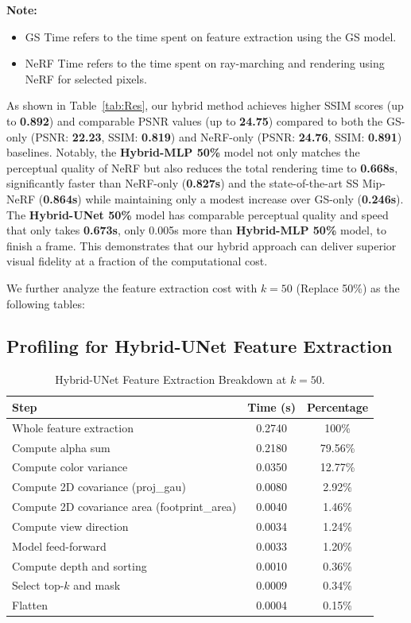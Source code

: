 \documentclass[10pt,letterpaper]{article}
\begin{document}
\noindent \textbf{Note:}
\begin{itemize}
	\item GS Time refers to the time spent on feature extraction using the GS model.
	\item NeRF Time refers to the time spent on ray-marching and rendering using NeRF for selected pixels.
\end{itemize}

As shown in Table~\ref{tab:Res}, our hybrid method achieves higher SSIM scores (up to \textbf{0.892}) and comparable PSNR values (up to \textbf{24.75}) compared to both the GS-only (PSNR: \textbf{22.23}, SSIM: \textbf{0.819}) and NeRF-only (PSNR: \textbf{24.76}, SSIM: \textbf{0.891}) baselines. Notably, the \textbf{Hybrid-MLP 50\%} model not only matches the perceptual quality of NeRF but also reduces the total rendering time to \textbf{0.668s}, significantly faster than NeRF-only (\textbf{0.827s}) and the state-of-the-art SS Mip-NeRF (\textbf{0.864s}) while maintaining only a modest increase over GS-only (\textbf{0.246s}). The \textbf{Hybrid-UNet 50\%} model has comparable perceptual quality and speed that only takes \textbf{0.673s}, only 0.005s more than \textbf{Hybrid-MLP 50\%} model, to finish a frame. This demonstrates that our hybrid approach can deliver superior visual fidelity at a fraction of the computational cost.


We further analyze the feature extraction cost with $k=50$ (Replace 50\%) as the following tables:

\subsection*{Profiling for Hybrid-UNet Feature Extraction}
\begin{table}[H]
	\centering
	\scriptsize
	\begin{tabular}{|l|c|c|}
		\hline
		Step & Time (s) & Percentage \\
		\hline
		Whole feature extraction   & 0.2740 & 100\% \\
		Compute alpha sum          & 0.2180 & 79.56\% \\
		Compute color variance     & 0.0350 & 12.77\% \\
		Compute 2D covariance (proj\_gau)      & 0.0080 & 2.92\% \\
		Compute 2D covariance area (footprint\_area) & 0.0040 & 1.46\% \\
		Compute view direction     & 0.0034 & 1.24\% \\
		Model feed-forward         & 0.0033 & 1.20\% \\
	    Compute depth and sorting  & 0.0010 & 0.36\% \\
	    Select top-$k$ and mask    & 0.0009 & 0.34\% \\
	    Flatten                    & 0.0004 & 0.15\% \\
		\hline
	\end{tabular}
	\caption{Hybrid-UNet Feature Extraction Breakdown at $k=50$.}
\end{table}
\end{document}
